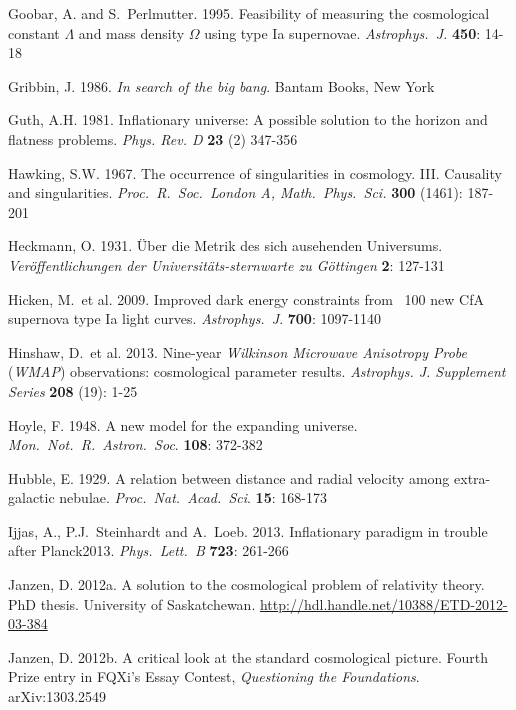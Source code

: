 \documentclass[12 pt]{article}
\begin{document}
\begin{thebibliography}{}
 Goobar, A. and S.\ Perlmutter. 1995. Feasibility of measuring the cosmological constant $\Lambda$ and mass density $\Omega$ using type Ia supernovae. \textit{Astrophys.\ J.} \textbf{450}: 14-18

 Gribbin, J. 1986. \textit{In search of the big bang}. Bantam Books, New York

 Guth, A.H. 1981. Inflationary universe: A possible solution to the horizon and flatness problems. \textit{Phys. Rev. D} \textbf{23} (2) 347-356

 Hawking, S.W. 1967. The occurrence of singularities in cosmology. III. Causality and singularities. \textit{Proc.\ R.\ Soc.\ London A, Math.\ Phys.\ Sci.} \textbf{300} (1461): 187-201

 Heckmann, O. 1931. \"{U}ber die Metrik des sich ausehenden Universums. \textit{Ver\"{o}ffentlichungen der Universit\"{a}ts-sternwarte zu G\"{o}ttingen} \textbf{2}: 127-131

 Hicken, M.\ et al. 2009. Improved dark energy constraints from ~100 new CfA supernova type Ia light curves. \textit{Astrophys.\ J}. \textbf{700}: 1097-1140 

 Hinshaw, D.\ et al. 2013. Nine-year \textit{Wilkinson Microwave Anisotropy Probe} (\textit{WMAP}) observations: cosmological parameter results. \textit{Astrophys. J. Supplement Series} \textbf{208} (19): 1-25

 Hoyle, F. 1948. A new model for the expanding universe. \textit{Mon.\ Not.\ R.\ Astron.\ Soc}. \textbf{108}: 372-382

 Hubble, E. 1929. A relation between distance and radial velocity among extra-galactic nebulae. \textit{Proc.\ Nat.\ Acad.\ Sci}. \textbf{15}: 168-173

 Ijjas, A., P.J.\ Steinhardt and A.\ Loeb. 2013. Inflationary paradigm in trouble after Planck2013. \textit{Phys.\ Lett.\ B} \textbf{723}: 261-266

 Janzen, D. 2012a. A solution to the cosmological problem of relativity theory. PhD thesis. University of Saskatchewan. \url{http://hdl.handle.net/10388/ETD-2012-03-384}

 Janzen, D. 2012b. A critical look at the standard cosmological picture. Fourth Prize entry in FQXi’s Essay Contest, \textit{Questioning the Foundations}. arXiv:1303.2549


\end{thebibliography}
\end{document}
